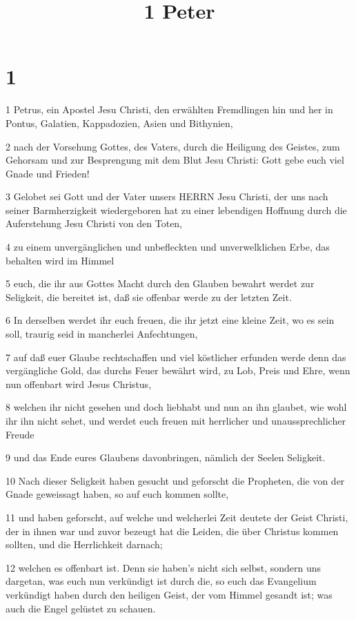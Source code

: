 

\title{1 Peter}


\chapter{1}

\par 1 Petrus, ein Apostel Jesu Christi, den erwählten Fremdlingen hin und her in Pontus, Galatien, Kappadozien, Asien und Bithynien,
\par 2 nach der Vorsehung Gottes, des Vaters, durch die Heiligung des Geistes, zum Gehorsam und zur Besprengung mit dem Blut Jesu Christi: Gott gebe euch viel Gnade und Frieden!
\par 3 Gelobet sei Gott und der Vater unsers HERRN Jesu Christi, der uns nach seiner Barmherzigkeit wiedergeboren hat zu einer lebendigen Hoffnung durch die Auferstehung Jesu Christi von den Toten,
\par 4 zu einem unvergänglichen und unbefleckten und unverwelklichen Erbe, das behalten wird im Himmel
\par 5 euch, die ihr aus Gottes Macht durch den Glauben bewahrt werdet zur Seligkeit, die bereitet ist, daß sie offenbar werde zu der letzten Zeit.
\par 6 In derselben werdet ihr euch freuen, die ihr jetzt eine kleine Zeit, wo es sein soll, traurig seid in mancherlei Anfechtungen,
\par 7 auf daß euer Glaube rechtschaffen und viel köstlicher erfunden werde denn das vergängliche Gold, das durchs Feuer bewährt wird, zu Lob, Preis und Ehre, wenn nun offenbart wird Jesus Christus,
\par 8 welchen ihr nicht gesehen und doch liebhabt und nun an ihn glaubet, wie wohl ihr ihn nicht sehet, und werdet euch freuen mit herrlicher und unaussprechlicher Freude
\par 9 und das Ende eures Glaubens davonbringen, nämlich der Seelen Seligkeit.
\par 10 Nach dieser Seligkeit haben gesucht und geforscht die Propheten, die von der Gnade geweissagt haben, so auf euch kommen sollte,
\par 11 und haben geforscht, auf welche und welcherlei Zeit deutete der Geist Christi, der in ihnen war und zuvor bezeugt hat die Leiden, die über Christus kommen sollten, und die Herrlichkeit darnach;
\par 12 welchen es offenbart ist. Denn sie haben's nicht sich selbst, sondern uns dargetan, was euch nun verkündigt ist durch die, so euch das Evangelium verkündigt haben durch den heiligen Geist, der vom Himmel gesandt ist; was auch die Engel gelüstet zu schauen.

